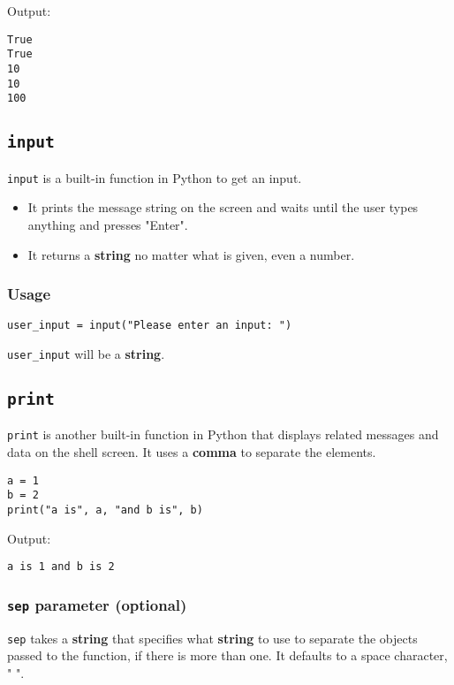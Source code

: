 \documentclass[11pt]{article}
\begin{document}
 \noindent Output:

\begin{verbatim}
True
True
10
10
100
\end{verbatim}

\subsection{\texttt{input}}
\label{sec:orgc424e1f}
\texttt{input} is a built-in function in Python to get an input.
\begin{itemize}
\item It prints the message string on the screen and waits until the user types anything and presses "Enter".
\item It returns a \textbf{string} no matter what is given, even a number.
\end{itemize}

\subsubsection{Usage}
\label{sec:orga9ff496}
\begin{verbatim}
user_input = input("Please enter an input: ")
\end{verbatim}

 \noindent \texttt{user\_input} will be a \textbf{string}.

 \newpage

\subsection{\texttt{print}}
\label{sec:org4577853}
\texttt{print} is another built-in function in Python that displays related messages and data on the shell screen. It uses a \textbf{comma} to separate the elements.

\begin{verbatim}
a = 1
b = 2
print("a is", a, "and b is", b)
\end{verbatim}

 \noindent Output:

\begin{verbatim}
a is 1 and b is 2
\end{verbatim}

\subsubsection{\texttt{sep} parameter (optional)}
\label{sec:org058f510}
\texttt{sep} takes a \textbf{string} that specifies what \textbf{string} to use to separate the objects passed to the function, if there is more than one. It defaults to a space character, " ".
\end{document}
